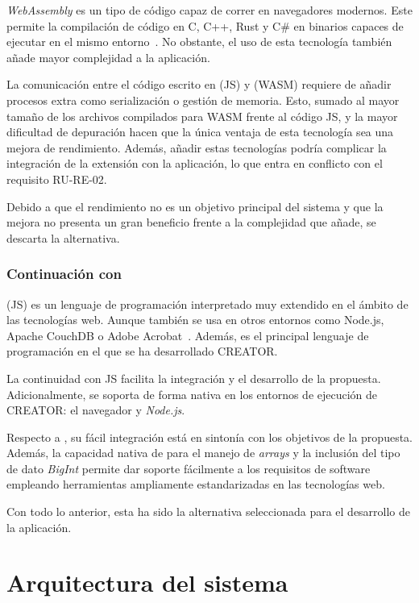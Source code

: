 \textit{WebAssembly} es un tipo de código capaz de correr en navegadores modernos. Este permite la compilación de código en C, C++, Rust y C\# en binarios capaces de ejecutar en el mismo entorno~\cite{webassembly}. No obstante, el uso de esta tecnología también añade mayor complejidad a la aplicación.

La comunicación entre el código escrito en \js (JS) y \wa (WASM) requiere de añadir procesos extra como serialización o gestión de memoria. Esto, sumado al mayor tamaño de los archivos compilados para WASM frente al código JS, y la mayor dificultad de depuración hacen que la única ventaja de esta tecnología sea una mejora de rendimiento. Además, añadir estas tecnologías podría complicar la integración de la extensión con la aplicación, lo que entra en conflicto con el requisito RU-RE-02.

Debido a que el rendimiento no es un objetivo principal del sistema y que la mejora no presenta un gran beneficio frente a la complejidad que añade, se descarta la alternativa.

\subsubsection{Continuación con \js}
{\js} (JS) es un lenguaje de programación interpretado muy extendido
en el ámbito de las tecnologías web. Aunque también se usa en otros entornos como
Node.js, Apache CouchDB o Adobe Acrobat~\cite{javascript}. Además, es el
principal lenguaje de programación en el que se ha desarrollado CREATOR\@.

La continuidad con JS facilita la integración y el desarrollo de la propuesta.
Adicionalmente, se soporta de forma nativa en los entornos de ejecución de
CREATOR: el navegador y \textit{Node.js}\@.

Respecto a {\js}, su fácil integración está en sintonía con los objetivos de la propuesta. Además, la capacidad nativa de {\js} para el manejo de \textit{arrays} y la inclusión del tipo de dato \textit{BigInt} permite dar soporte fácilmente a los requisitos de software empleando herramientas ampliamente estandarizadas en las tecnologías web. 

Con todo lo anterior, esta ha sido la alternativa seleccionada para el desarrollo de la aplicación.

\section{Arquitectura del sistema}\label{sec:arch-design}

